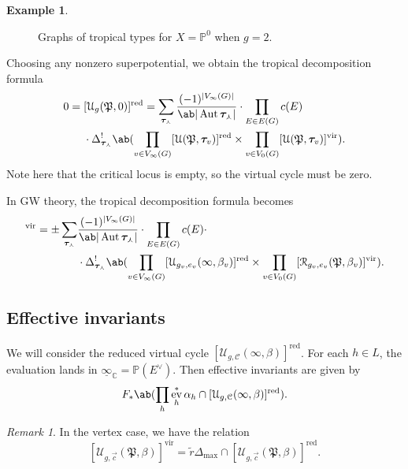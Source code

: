 \documentclass[10pt]{amsart}
\theoremstyle{definition}
\newtheorem{exm}[thm]{Example}
\theoremstyle{remark}
\newtheorem{rmk}[thm]{Remark}
\theoremstyle{plain}
\theoremstyle{definition}
\theoremstyle{remark}
\newcommand{\C}{\mathbb{C}}
\renewcommand{\P}{\mathbb{P}}
\newcommand{\Mbar}{\overline{\mathcal{M}}}
\newcommand{\mc}[1]{\mathcal{#1}}
\newcommand{\mf}[1]{\mathfrak{#1}}
\newcommand{\btau}{\bm{\tau}}
\newcommand{\mr}[1]{\mathrm{#1}}
\newcommand{\on}[1]{\operatorname{#1}}
\newcommand{\ul}[1]{\underline{#1}}
\newcommand{\1}{\mathbf{1}}
\newcommand{\2}{\mathbf{2}}
\newcommand{\3}{\mathbf{3}}
\newcommand{\vir}{\mr{vir}}
\newcommand{\red}{\mr{red}}
\DeclareMathOperator{\Aut}{Aut}
\DeclareMathOperator{\ev}{ev}
\begin{document}
\begin{exm}
\begin{figure}[htpb]
\begin{center}
    \end{center}
    \caption{Graphs of tropical types for $X = \P^0$ when $g=2$.}%
    \label{fig:tropgraphs}
    \end{figure}
    Choosing any nonzero superpotential, we obtain the tropical decomposition formula
    \begin{align*}
        0 ={}& [\mc{U}_g(\mf{P},0)]^{\red} = \sum_{\btau_{\curlywedge}} \frac{(-1)^{|V_{\infty}(G)|}}{\ab|\Aut\btau_{\curlywedge}|} \cdot \prod_{E \in E(G)} c(E) \\
    & \cdot \Delta_{\btau_{\curlywedge}}^! \ab( \prod_{v \in V_{\infty}(G)}[\mc{U}(\mf{P},\btau_{v})]^{\red} \times \prod_{v \in V_0(G)} [\mc{U}(\mf{P},\btau_v)]^{\vir}).
    \end{align*}
    Note here that the critical locus is empty, so the virtual cycle must be zero.
\end{exm}


In GW theory, the tropical decomposition formula becomes
\begin{align*}
    [\Mbar_{g,n}(Z,\beta)]^{\vir} = \pm \sum_{\btau_{\curlywedge}}& \frac{(-1)^{|V_{\infty}(G)|}}{\ab|\Aut \btau_{\curlywedge}|} \cdot \prod_{E \in E(G)} c(E) \cdot \\
    &\cdot \Delta_{\btau_{\curlywedge}}^! \ab(\prod_{v \in V_{\infty}(G)}[\mc{U}_{g_v, e_v}(\infty,\beta_v)]^{\on{red}} \times \prod_{v \in V_0(G)} [\mc{R}_{g_v, e_v}(\mf{P}, \beta_v)]^{\vir}).
\end{align*}

\subsection{Effective invariants}%
\label{sub:Effective invariants}

We will consider the reduced virtual cycle $[\mc{U}_{g,\mc{C}}(\infty, \beta)]^{\on{red}}$. For each $h \in L$, the evaluation lands in $\ul{\infty}_{\C} = \P(E^{\vee})$. Then effective invariants are given by
\[ F_* \ab(\prod_h \ev_h^* \alpha_h \cap [\mc{U}_{g, \mc{C}}(\infty, \beta)]^{\on{red}}). \]

\begin{rmk}
    In the vertex case, we have the relation
    \[ [\mc{U}_{g, \vec{c}}(\mf{P}, \beta)]^{\vir} = \tilde{r} \Delta_{\max} \cap [\mc{U}_{g, \vec{c}}(\mf{P}, \beta)]^{\on{red}}. \]
\end{rmk}
\end{document}
